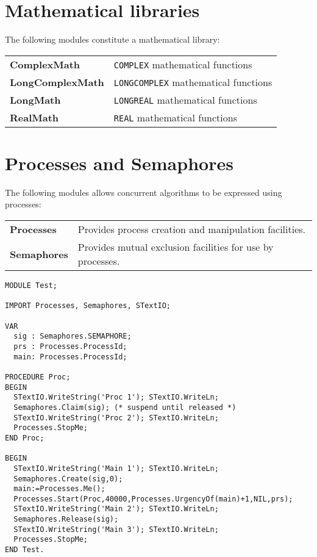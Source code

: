 \section{Mathematical libraries}

The following modules constitute a mathematical library:
\begin{flushleft}
\begin{tabular}{ll}
\bf ComplexMath     & \verb'COMPLEX' mathematical functions      \\
\bf LongComplexMath & \verb'LONGCOMPLEX' mathematical functions  \\
\bf LongMath        & \verb'LONGREAL' mathematical functions     \\
\bf RealMath        & \verb'REAL' mathematical functions         \\
\end{tabular}
\end{flushleft}

\section{Processes and Semaphores}

The following modules allows concurrent algorithms to be expressed using processes:
\begin{flushleft}
\begin{tabular}{ll}
\bf Processes  & Provides process creation and manipulation facilities. \\
\bf Semaphores & Provides mutual exclusion facilities for use by processes. \\
\end{tabular}
\end{flushleft}

\Example
\begin{verbatim}
MODULE Test;

IMPORT Processes, Semaphores, STextIO;

VAR
  sig : Semaphores.SEMAPHORE;
  prs : Processes.ProcessId;
  main: Processes.ProcessId;

PROCEDURE Proc;
BEGIN
  STextIO.WriteString('Proc 1'); STextIO.WriteLn;
  Semaphores.Claim(sig); (* suspend until released *)
  STextIO.WriteString('Proc 2'); STextIO.WriteLn;
  Processes.StopMe;
END Proc;

BEGIN
  STextIO.WriteString('Main 1'); STextIO.WriteLn;
  Semaphores.Create(sig,0);
  main:=Processes.Me();
  Processes.Start(Proc,40000,Processes.UrgencyOf(main)+1,NIL,prs);
  STextIO.WriteString('Main 2'); STextIO.WriteLn;
  Semaphores.Release(sig);
  STextIO.WriteString('Main 3'); STextIO.WriteLn;
  Processes.StopMe;
END Test.
\end{verbatim}

